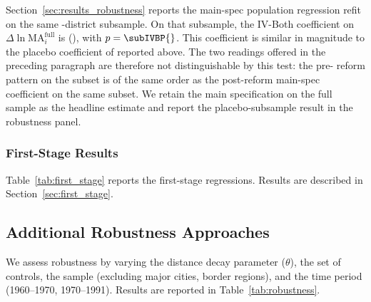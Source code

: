Section~\ref{sec:results_robustness} reports the main-spec population
regression refit on the same \placeboNIVBoth{}-district subsample. On that
subsample, the IV-Both coefficient on $\Delta \ln
\mathrm{MA}^{\mathrm{full}}_i$ is \subIVBCoef{} (\subIVBSE{}), with $p=\subIVBP{}$. This
coefficient is similar in magnitude to the placebo coefficient of
\placeboCoefIVBoth{} reported above. The two readings offered in the preceding
paragraph are therefore not distinguishable by this test: the pre-
reform pattern on the \placeboNIVBoth{} subset is of the same order as the
post-reform main-spec coefficient on the same subset. We retain the
main specification on the full sample as the headline estimate and
report the placebo-subsample result in the robustness panel.



\subsubsection{First-Stage Results}
\label{sec:first_stage_tab}

Table~\ref{tab:first_stage} reports the first-stage regressions.
Results are described in Section~\ref{sec:first_stage}.



\subsection{Additional Robustness Approaches}

We assess robustness by varying the distance decay parameter
($\theta$), the set of controls, the sample (excluding major cities,
border regions), and the time period (1960--1970, 1970--1991).
Results are reported in Table~\ref{tab:robustness}.
